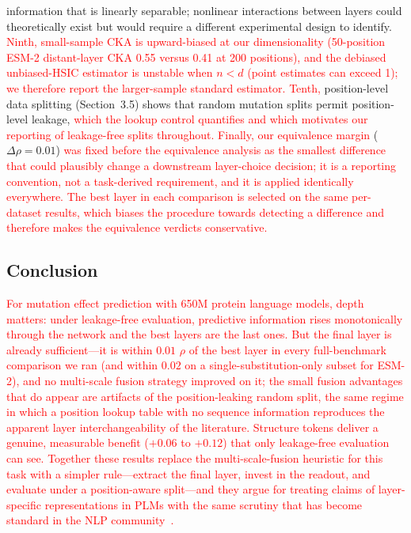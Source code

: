 \documentclass[numbered,webpdf,modern,large]{oup-authoring-template}
\newcommand{\rev}[1]{\textcolor{red}{#1}}
\begin{document}
information that is linearly separable; nonlinear interactions between layers
could theoretically exist but would require a different experimental design to
identify. \rev{Ninth, small-sample CKA is upward-biased at our dimensionality
(50-position ESM-2 distant-layer CKA 0.55 versus 0.41 at 200 positions), and
the debiased unbiased-HSIC estimator is unstable when $n < d$ (point estimates
can exceed 1); we therefore report the larger-sample standard estimator.
Tenth,} position-level data splitting (Section~3.5) shows that
random mutation splits permit position-level leakage, \rev{which the lookup
control quantifies and which motivates our reporting of leakage-free splits
throughout. Finally, our equivalence margin}
($\Delta\rho = 0.01$) \rev{was fixed before the equivalence analysis as the
smallest difference that could plausibly change a downstream layer-choice
decision; it is a reporting convention, not a task-derived requirement, and it
is applied identically everywhere.} \rev{The best layer in each comparison is
selected on the same per-dataset results, which biases the procedure towards
detecting a difference and therefore makes the equivalence verdicts
conservative.}

\subsection{Conclusion}

\rev{For mutation effect prediction with 650M protein language models, depth
matters: under leakage-free evaluation, predictive information rises
monotonically through the network and the best layers are the last ones. But
the final layer is already sufficient---it is within $0.01$ $\rho$ of the best
layer in every full-benchmark comparison we ran (and within $0.02$ on a
single-substitution-only subset for ESM-2), and no multi-scale fusion
strategy improved
on it; the small fusion advantages that do appear are artifacts of the
position-leaking random split, the same regime in which a position lookup
table with no sequence information reproduces the apparent layer
interchangeability of the literature. Structure tokens deliver a genuine,
measurable benefit ($+0.06$ to $+0.12$) that only leakage-free evaluation can
see. Together these results replace the multi-scale-fusion heuristic for this
task with a simpler rule---extract the final layer, invest in the readout, and
evaluate under a position-aware split---and they argue for treating claims of
layer-specific representations in PLMs with
the same scrutiny that has become standard in the NLP
community~\cite{rogers2021bertology}.}
\end{document}
